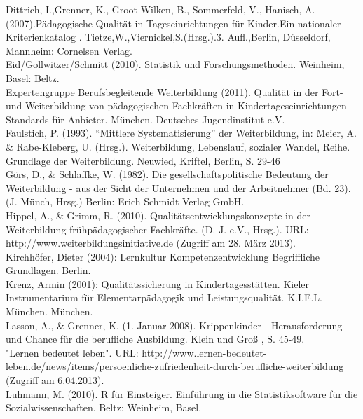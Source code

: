 \documentclass[12pt,a4paper]{article}
\begin{document}
Dittrich, I.,Grenner, K., Groot-Wilken, B., Sommerfeld, V., Hanisch, A. (2007).Pädagogische Qualität in Tageseinrichtungen für Kinder.Ein nationaler Kriterienkatalog . Tietze,W.,Viernickel,S.(Hrsg.).3. Aufl.,Berlin, Düsseldorf, Mannheim: Cornelsen Verlag.\\

Eid/Gollwitzer/Schmitt (2010). Statistik und Forschungsmethoden. Weinheim, Basel: Beltz.\\

Expertengruppe Berufsbegleitende Weiterbildung (2011). Qualität in der Fort- und Weiterbildung von pädagogischen Fachkräften in Kindertageseinrichtungen – Standards für Anbieter. München. Deutsches Jugendinstitut e.V.\\ 

Faulstich, P. (1993). "`Mittlere Systematisierung"' der Weiterbildung, in: Meier, A. \& Rabe-Kleberg, U. (Hrsg.). Weiterbildung, Lebenslauf, sozialer Wandel, Reihe. Grundlage der Weiterbildung. Neuwied, Kriftel, Berlin, S. 29-46\\
Görs, D., \& Schlaffke, W. (1982). Die gesellschaftspolitische Bedeutung der Weiterbildung - aus der Sicht der Unternehmen und der Arbeitnehmer (Bd. 23). (J. Münch, Hrsg.) Berlin: Erich Schmidt Verlag GmbH.\\

Hippel, A., \& Grimm, R. (2010). Qualitätsentwicklungskonzepte in der Weiterbildung frühpädagogischer Fachkräfte. (D. J. e.V., Hrsg.). URL: http://\-www.wei\-ter\-bil\-dungs\-ini\-tia\-tive.de (Zugriff am 28. März 2013).\\

Kirchhöfer, Dieter (2004): Lernkultur Kompetenzentwicklung Begriffliche Grundlagen. Berlin. \\

Krenz, Armin (2001): Qualitätssicherung in Kindertagesstätten. Kieler Instrumentarium für Elementarpädagogik und Leistungsqualität. K.I.E.L. München. München.\\

Lasson, A., \& Grenner, K. (1. Januar 2008). Krippenkinder - Herausforderung und Chance für die berufliche Ausbildung. Klein und Groß , S. 45-49.\\

"Lernen bedeutet leben". URL: http://www.lernen-bedeutet-leben.de/news\-/items/persoenliche-zufriedenheit-durch-berufliche-weiterbildung (Zugriff am 6.04.2013).\\

Luhmann, M. (2010). R für Einsteiger. Einführung in die Statistiksoftware für die Sozialwissenschaften. Beltz: Weinheim, Basel.\\
\end{document}
